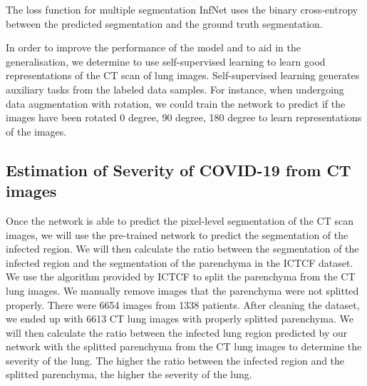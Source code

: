 The loss function for multiple segmentation InfNet uses the binary cross-entropy between the predicted segmentation and the ground truth segmentation.

In order to improve the performance of the model and to aid in the generalisation, we  determine to use self-supervised learning to learn good representations of the CT scan of lung images. Self-supervised learning generates auxiliary tasks from the labeled data samples. For instance, when undergoing data augmentation with rotation, we could train the network to predict if the images have been rotated 0 degree, 90 degree, 180 degree to learn representations of the images. 


\subsection{Estimation of Severity of COVID-19 from CT images}
Once the network is able to predict the pixel-level segmentation of the CT scan images, we will use the pre-trained network to predict the segmentation of the infected region. We will then calculate the ratio between the segmentation of the infected region and the segmentation of the parenchyma in the ICTCF dataset. We use the algorithm provided by ICTCF to split the parenchyma from the CT lung images. We manually remove images that the parenchyma were not splitted properly. There were 6654 images from 1338 patients. After cleaning the dataset, we ended up with 6613 CT lung images with properly splitted parenchyma. We will then calculate the ratio between the infected lung region predicted by our network with the splitted parenchyma from the CT lung images to determine the severity of the lung. The higher the ratio between the infected region and the splitted parenchyma, the higher the severity of the lung.


